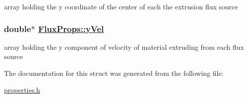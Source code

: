 array holding the y coordinate of the center of each the extrusion flux source 

\hypertarget{structFluxProps_o11}{
\subsubsection[yVel]{\setlength{\rightskip}{0pt plus 5cm}double$\ast$ \hyperlink{structFluxProps_o11}{Flux\-Props::y\-Vel}}}
\label{structFluxProps_o11}


array holding the y component of velocity of material extruding from each flux source 



The documentation for this struct was generated from the following file:\begin{CompactItemize}
\item 
\hyperlink{properties_8h}{properties.h}\end{CompactItemize}
